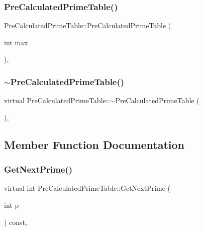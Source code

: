 \subsubsection{\texorpdfstring{PreCalculatedPrimeTable()}{PreCalculatedPrimeTable()}}
{\footnotesize\ttfamily Pre\+Calculated\+Prime\+Table\+::\+Pre\+Calculated\+Prime\+Table (\begin{DoxyParamCaption}\item[{int}]{max }\end{DoxyParamCaption})\hspace{0.3cm}{\ttfamily [inline]}, {\ttfamily [explicit]}}

\mbox{\label{classPreCalculatedPrimeTable_a6ceab295f80dbe2766b8d4f54138bbc4}} 
\subsubsection{\texorpdfstring{$\sim$PreCalculatedPrimeTable()}{~PreCalculatedPrimeTable()}}
{\footnotesize\ttfamily virtual Pre\+Calculated\+Prime\+Table\+::$\sim$\+Pre\+Calculated\+Prime\+Table (\begin{DoxyParamCaption}{ }\end{DoxyParamCaption})\hspace{0.3cm}{\ttfamily [inline]}, {\ttfamily [virtual]}}



\subsection{Member Function Documentation}
\mbox{\label{classPreCalculatedPrimeTable_a0ff10b1fe13df7e56b8d7ed9f41d3998}} 
\subsubsection{\texorpdfstring{GetNextPrime()}{GetNextPrime()}}
{\footnotesize\ttfamily virtual int Pre\+Calculated\+Prime\+Table\+::\+Get\+Next\+Prime (\begin{DoxyParamCaption}\item[{int}]{p }\end{DoxyParamCaption}) const\hspace{0.3cm}{\ttfamily [inline]}, {\ttfamily [virtual]}}



